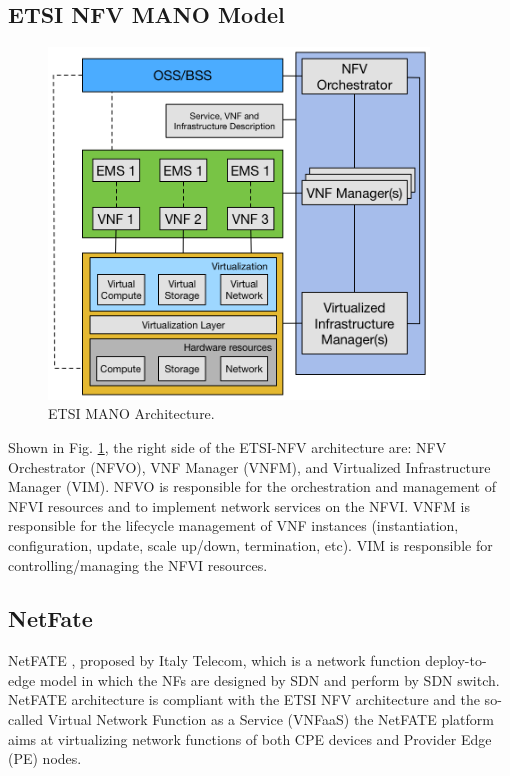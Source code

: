 \subsection{ETSI NFV MANO Model}

\begin{figure}[!t]
\centering
\includegraphics[width=0.9\textwidth]{./fig/etsi_nfv_architecture}
\caption{ETSI MANO Architecture. \cite{etsi-nfv-archi}}
\label{fig:etsi_nfv_architecture}
\end{figure}

Shown in Fig. \ref{fig:etsi_nfv_architecture}, the right side of the ETSI-NFV architecture \cite{etsi-nfv-archi} are: NFV Orchestrator (NFVO), VNF Manager (VNFM), and Virtualized Infrastructure Manager (VIM). NFVO is responsible for the orchestration and management of NFVI resources and to implement network services on the NFVI. VNFM is responsible for the lifecycle management of VNF instances (instantiation, configuration, update, scale up/down, termination, etc). VIM is responsible for controlling/managing the NFVI resources.

\subsection{NetFate}

NetFATE \cite{netfate}, proposed by Italy Telecom, which is a network function deploy-to-edge model in which the NFs are designed by SDN and perform by SDN switch. NetFATE architecture is compliant with the ETSI NFV architecture\cite{etsi-nfv-archi} and the so-called Virtual Network Function as a Service (VNFaaS) the NetFATE platform aims at virtualizing network functions of both CPE devices and Provider Edge (PE) nodes.

